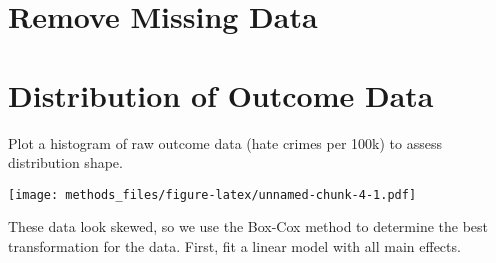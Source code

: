 \documentclass[
]{article}
\newenvironment{Shaded}{\begin{snugshade}}{\end{snugshade}}
\newcommand{\CommentTok}[1]{\textcolor[rgb]{0.56,0.35,0.01}{\textit{#1}}}
\newcommand{\DataTypeTok}[1]{\textcolor[rgb]{0.13,0.29,0.53}{#1}}
\newcommand{\DecValTok}[1]{\textcolor[rgb]{0.00,0.00,0.81}{#1}}
\newcommand{\FloatTok}[1]{\textcolor[rgb]{0.00,0.00,0.81}{#1}}
\newcommand{\KeywordTok}[1]{\textcolor[rgb]{0.13,0.29,0.53}{\textbf{#1}}}
\newcommand{\NormalTok}[1]{#1}
\newcommand{\OperatorTok}[1]{\textcolor[rgb]{0.81,0.36,0.00}{\textbf{#1}}}
\newcommand{\StringTok}[1]{\textcolor[rgb]{0.31,0.60,0.02}{#1}}
\begin{document}
\hypertarget{remove-missing-data}{%
\section{Remove Missing Data}\label{remove-missing-data}}

\begin{Shaded}
\end{Shaded}

\hypertarget{distribution-of-outcome-data}{%
\section{Distribution of Outcome
Data}\label{distribution-of-outcome-data}}

Plot a histogram of raw outcome data (hate crimes per 100k) to assess
distribution shape.

\begin{Shaded}
\end{Shaded}

\texttt{[image: methods\_files/figure-latex/unnamed-chunk-4-1.pdf]}

These data look skewed, so we use the Box-Cox method to determine the
best transformation for the data. First, fit a linear model with all
main effects.
\end{document}

